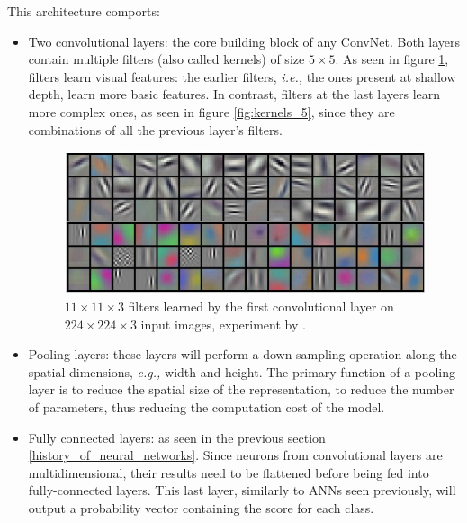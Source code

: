 This architecture comports:
\begin{itemize}
    \item Two convolutional layers: the core building block of any ConvNet. Both
          layers contain multiple filters (also called kernels) of size $5
              \times 5$. As seen in figure \ref{fig:kernels}, filters learn visual
          features: the earlier filters, \emph{i.e.,} the ones present at
          shallow depth, learn more basic features. In contrast, filters at the
          last layers learn more complex ones, as seen in figure
          \ref{fig:kernels_5}, since they are combinations of all the previous
          layer's filters.
          \begin{figure}[ht]
              \includegraphics[clip,width=1\columnwidth]{Figures/related/kernels.jpeg}
              \caption{ $11 \times 11 \times 3$ filters learned by the first convolutional
                  layer on $224 \times 224 \times 3$ input images, experiment by
                  \cite{krizhevsky_imagenet_2017-1}. }
              \label{fig:kernels}
          \end{figure}
    \item Pooling layers: these layers will perform a down-sampling operation
          along the spatial dimensions, \emph{e.g.,} width and height. The
          primary function of a pooling layer is to reduce the spatial size of
          the representation, to reduce the number of parameters, thus reducing
          the computation cost of the model.
    \item Fully connected layers: as seen in the previous section
          \ref{history_of_neural_networks}. Since neurons from convolutional
          layers are multidimensional, their results need to be flattened before
          being fed into fully-connected layers. This last layer, similarly to
          ANNs seen previously, will output a probability vector containing the
          score for each class.
\end{itemize}



